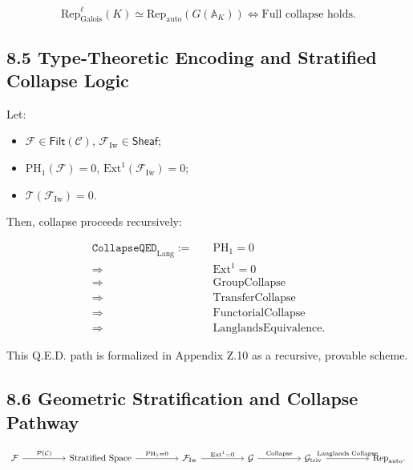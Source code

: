 \documentclass[11pt]{article}
\begin{document}
\[
\mathrm{Rep}_{\mathrm{Galois}}^\ell(K) \simeq \mathrm{Rep}_{\mathrm{auto}}(G(\mathbb{A}_K)) \iff \text{Full collapse holds}.
\]

\subsection*{8.5 Type-Theoretic Encoding and Stratified Collapse Logic}

Let:

\begin{itemize}
    \item \( \mathcal{F} \in \mathsf{Filt}(\mathcal{C}) \), \( \mathcal{F}_{\mathrm{Iw}} \in \mathsf{Sheaf} \);
    \item \( \mathrm{PH}_1(\mathcal{F}) = 0 \), \( \mathrm{Ext}^1(\mathcal{F}_{\mathrm{Iw}}) = 0 \);
    \item \( \mathcal{T}(\mathcal{F}_{\mathrm{Iw}}) = 0 \).
\end{itemize}

Then, collapse proceeds recursively:

\[
\begin{aligned}
\texttt{CollapseQED}_{\mathrm{Lang}} :=\quad
& \mathrm{PH}_1 = 0 \\
\Rightarrow\ & \mathrm{Ext}^1 = 0 \\
\Rightarrow\ & \text{GroupCollapse} \\
\Rightarrow\ & \text{TransferCollapse} \\
\Rightarrow\ & \text{FunctorialCollapse} \\
\Rightarrow\ & \text{LanglandsEquivalence}.
\end{aligned}
\]


This Q.E.D. path is formalized in Appendix Z.10 as a recursive, provable scheme.

\subsection*{8.6 Geometric Stratification and Collapse Pathway}

\[
\begin{tikzcd}[column sep=huge]
\mathcal{F} \arrow[r, "\mathcal{P}(\mathcal{C})"]
& \text{Stratified Space} \arrow[r, "\mathrm{PH}_1 = 0"]
& \mathcal{F}_{\mathrm{Iw}} \arrow[r, "\mathrm{Ext}^1 = 0"]
& \mathcal{G} \arrow[r, "\text{Collapse}"]
& \mathcal{G}_{\mathrm{triv}} \arrow[r, "\text{Langlands Collapse}"]
& \mathrm{Rep}_{\mathrm{auto}}.
\end{tikzcd}
\]
\end{document}

